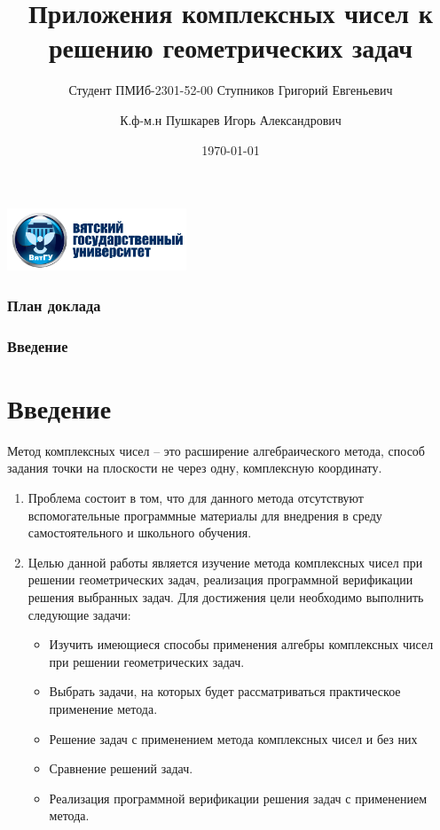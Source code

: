 \documentclass{beamer}
\title[]{Приложения комплексных чисел к решению геометрических задач}
\institute[]{ФГБОУ ВО «Вятский государственный университет»}
\date{\today}
\author[ ]{Студент ПМИб-2301-52-00 Ступников Григорий Евгеньевич \and К.ф-м.н Пушкарев Игорь Александрович}
\newcommand\frametitleSpec[1]{%
\frametitle{#1}
\section{#1}%
}
\begin{document}
\begin{frame}
   \centering\includegraphics[width=0.4\textwidth]{images/vyatsu_logo.png}\\
   \titlepage
\end{frame}
\begin{frame}
   \frametitle{План доклада}

   \tableofcontents

\end{frame}
\begin{frame}
   \frametitleSpec{Введение}
   Метод комплексных чисел -- это расширение алгебраического метода, способ задания точки на плоскости не через одну, комплексную координату.
   \begin{enumerate}
      \item Проблема состоит в том, что для данного метода отсутствуют вспомогательные программные материалы для внедрения в среду самостоятельного и школьного обучения.
      \item Целью данной работы является изучение метода комплексных чисел при решении геометрических задач, реализация программной верификации решения выбранных задач. Для достижения цели необходимо выполнить следующие задачи:
            \begin{itemize}
               \item Изучить имеющиеся способы применения алгебры комплексных чисел при решении геометрических задач.
               \item Выбрать задачи, на которых будет рассматриваться практическое применение метода.
               \item Решение задач с применением метода комплексных чисел и без них
               \item Сравнение решений задач.
               \item Реализация программной верификации решения задач с применением метода.
            \end{itemize}
   \end{enumerate}
\end{frame}
\end{document}
